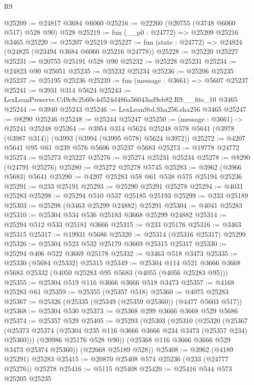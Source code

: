 \begin{lexlean}{R9}
\begin{coremodule}
@25209 := @24817 @3684 @6060
@25216 := @22260 (@20755 (@3748 @6060 @517) @528 @90) @528
@25219 := fun (__p0 : @24772) => @25209 @25216 @3465
@25220 := @25207 @25219
@25227 := fun (state : @24772) => @24824 (@24825 (@23494 @3684 @6060 @25216 @24778))
@25228 := @25220 @25227
@25231 := @20755 @25191 @528 @90
@25232 := @25228 @25231
@25234 := @24823 @90 @25051
@25235 := @25232 @25234
@25236 := @25206 @25235
@25237 := @25195 @25236
@25239 := fun (message : @3661) => @5607 @25237
@25241 := @3931 @314 @5624
@25243 := LexLeanPreserve.Cd9c8c2b60c4d524d486a56043ad9eb82.R9.__fits_10 @3465
@25244 := @3940 @25243
@25246 := LexLeanStd.Sha256.sha256 @3465
@25247 := @8290 @25246
@25248 := @25244 @25247
@25250 := (message : @3661) -> @25241 @25248
@25264 := @3954
    @314
    @5624
    @25248
    @578
    @5641
    (@3978 (@3987 @314))
    (@3993 (@3994 (@3995 @578) @5624 @3972))
@25272 := @4207 @5641 @95 @61 @239 @576 @5606 @25237 @5683
@25273 := @19778 @24772
@25274 := @25273 @25227
@25276 := @25274 @25231 @25234
@25278 := @8290 (@24791 @25276)
@25280 := @25272 @25278 @5745
@25283 := @3962 (@3966 @5683) @5641
@25290 := @4207 @25283 @58 @61 @538 @575 @25194 @25236
@25291 := @233 @25191
@25293 := @25290 @25291 @25278
@25294 := @4031 @25283
@25298 := @25294 @510 @537 @25185 @25193
@25299 := @233 @25189
@25303 := @25298 (@3463 @25299 @24882) @25291
@25304 := @4041 @25283
@25310 := @25304 @534 @536 @25183 @3668 @25299 @24882
@25314 := @25294 @512 @533 @25181 @3666
@25315 := @233 @25176
@25316 := @3463 @25315
@25317 := @19931 @5686
@25320 := @25314 (@25316 @25317) @25299
@25326 := @25304 @523 @532 @25179 @3669 @25315 @25317
@25330 := @25294 @406 @522 @3669 @25178
@25332 := @3463 @518 @3473
@25335 := @25330 (@5684 @25332) @25315
@25349 := @25304
    @114
    @521
    @3666
    @3668
    @5683
    @25332
    (@4050 @25283 @95 @5683 (@4055 (@4056 @25283 @95)))
@25355 := @25304 @519 @116 @3666 @3666 @518 @3473
@25357 := @4168 @25283 @61
@25359 := @25355 (@25357 @518)
@25360 := @4075 @25283
@25367 := @25326 (@25335 (@25349 (@25359 @25360)) (@4477 @5603 @517))
@25368 := @25304 @530
@25373 := @25368 @299 @3666 @3668 @529 @5686
@25374 := @25357 @529
@25405 := @25293
    (@25303
      (@25310
        (@25320
          (@25367 (@25373 @25374 (@25304 @235 @116 @3666 @3666 @234 @3473 (@25357 @234) @25360)))
          (@20986 @25176 @528 @90))
        (@25368 @116 @3666 @3666 @529 @3473 @25374 @25360))
      (@22668 @25189 @528))
@25408 := @3962 (@4189 @25291) @25283
@25415 := @20870 @25408 @574 @25236 (@233 (@24777 @25276)) @25278
@25416 := @5115 @25408
@25420 := @25416 @544 @573 @25205 @25235

\end{coremodule}
\end{lexlean}
